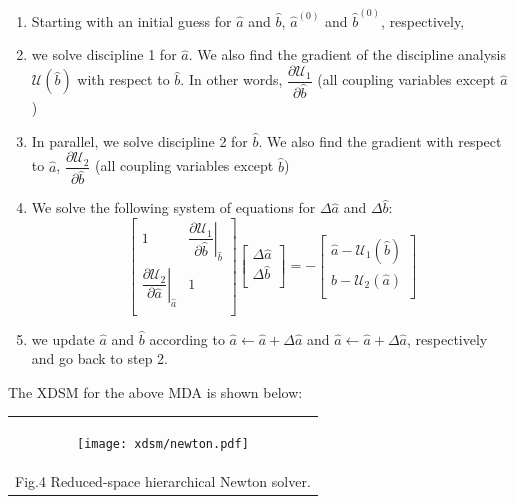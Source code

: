 \documentclass[11pt]{article}
\providecommand{\tightlist}{%
      \setlength{\itemsep}{0pt}\setlength{\parskip}{0pt}}
\begin{document}
\begin{enumerate}
\def\labelenumi{\arabic{enumi})}
\tightlist
\item
  Starting with an initial guess for \(\hat{a}\) and \(\hat{b}\),
  \(\hat{a}^{(0)}\) and \(\hat{b}^{(0)}\), respectively,
\item
  we solve discipline 1 for \(\hat{a}\). We also find the gradient of
  the discipline analysis \(\mathcal{U}(\hat{b})\) with respect to
  \(\hat{b}\). In other words,
  \(\dfrac{\partial\mathcal{U}_1}{\partial\hat{b}}\) (all coupling
  variables except \(\hat{a}\))
\item
  In parallel, we solve discipline 2 for \(\hat{b}\). We also find the
  gradient with respect to \(\hat{a}\),
  \(\dfrac{\partial\mathcal{U}_2}{\partial\hat{b}}\) (all coupling
  variables except \(\hat{b}\))
\item
  We solve the following system of equations for \(\Delta\hat{a}\) and
  \(\Delta\hat{b}\): \[
  \begin{bmatrix}
   1       & \left.\dfrac{\partial\mathcal{U}_1}{\partial\hat{b}}\right|_{\hat{b}}  \\
   \left.\dfrac{\partial\mathcal{U}_2}{\partial\hat{a}}\right|_{\hat{a}}        & 1  \\
  \end{bmatrix}
  \begin{bmatrix}
   \Delta\hat{a}\\
   \Delta\hat{b}\\
  \end{bmatrix} = -
  \begin{bmatrix}
   \hat{a} - \mathcal{U}_1(\hat{b})\\
   \hat{b} - \mathcal{U}_2(\hat{a})\\
  \end{bmatrix}
  \]
\item
  we update \(\hat{a}\) and \(\hat{b}\) according to
  \(\hat{a} \gets \hat{a} + \Delta\hat{a}\) and
  \(\hat{a} \gets \hat{a} + \Delta\hat{a}\), respectively and go back to
  step 2.
\end{enumerate}

The XDSM for the above MDA is shown below:

\begin{longtable}[]{@{}c@{}}
\toprule
\endhead
\begin{minipage}[t]{0.97\columnwidth}\centering
    \begin{figure}
        \centering
        \texttt{[image: xdsm/newton.pdf]}
    \end{figure}
\end{minipage}\tabularnewline
Fig.4 Reduced-space hierarchical Newton solver.\tabularnewline
\bottomrule
\end{longtable}
\end{document}
